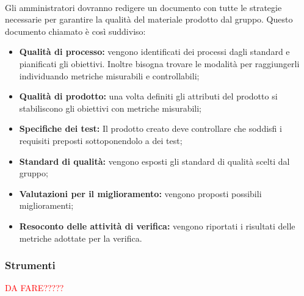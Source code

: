 \paragraph{\PdQ} Gli amministratori dovranno redigere un documento con tutte le strategie necessarie per garantire la qualità del materiale prodotto dal gruppo. Questo documento chiamato \PdQv è così suddiviso:
\begin{itemize}
    \item \textbf{Qualità di processo:} vengono identificati dei processi dagli standard e pianificati gli obiettivi. Inoltre bisogna trovare le modalità per raggiungerli individuando metriche misurabili e controllabili;
    
    \item \textbf{Qualità di prodotto:} una volta definiti gli attributi del prodotto si stabiliscono gli obiettivi con metriche misurabili;
    
    \item \textbf{Specifiche dei test:} Il prodotto creato deve controllare che soddisfi i requisiti preposti sottoponendolo a dei test;
    
    \item \textbf{Standard di qualità:} vengono esposti gli standard di qualità scelti dal gruppo;
    
    \item \textbf{Valutazioni per il miglioramento:} vengono proposti possibili miglioramenti;
    
    \item \textbf{Resoconto delle attività di verifica:} vengono riportati i risultati delle metriche adottate per la verifica.
\end{itemize}

\subsubsection{Strumenti}
\textcolor{red}{DA FARE?????}
